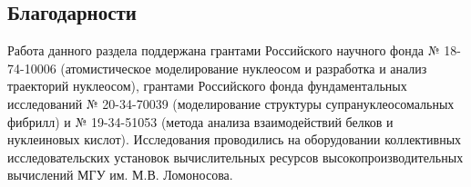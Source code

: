 \subsection{Благодарности}

Работа данного раздела поддержана грантами Российского научного фонда № 18-74-10006 (атомистическое моделирование нуклеосом и разработка и анализ траекторий нуклеосом), грантами Российского фонда фундаментальных исследований № 20-34-70039 (моделирование структуры супрануклеосомальных фибрилл) и № 19-34-51053 (метода анализа взаимодействий белков и нуклеиновых кислот). Исследования проводились на оборудовании коллективных исследовательских установок вычислительных ресурсов высокопроизводительных вычислений МГУ им. М.В. Ломоносова.